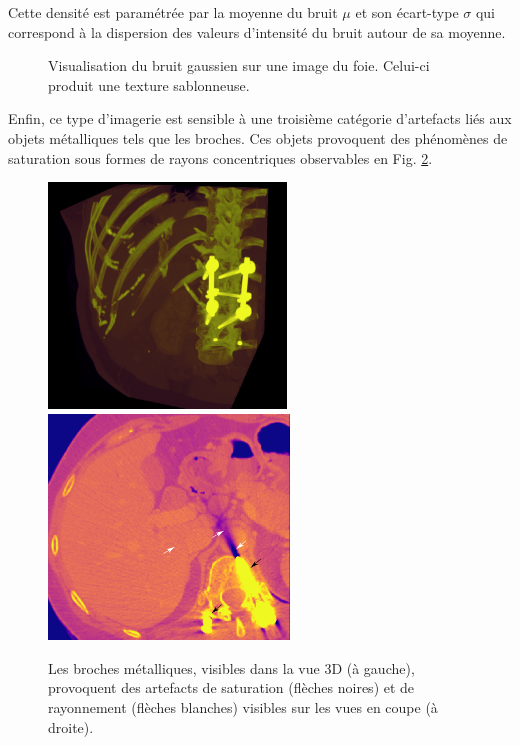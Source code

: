 Cette densité est paramétrée par la moyenne du bruit $\mu$ et son écart-type $\sigma$ qui correspond à la dispersion des valeurs d'intensité du bruit autour de sa moyenne.

\begin{figure}
    \centering
    \caption{Visualisation du bruit gaussien sur une image du foie. Celui-ci produit une texture sablonneuse.}
    \label{fig:CT_noise}
\end{figure}

Enfin, ce type d'imagerie est sensible à une troisième catégorie d'artefacts liés aux objets métalliques tels que les broches. Ces objets provoquent des phénomènes de saturation sous formes de rayons concentriques observables en Fig. \ref{fig:metallic artefacts}.

\begin{figure}
    \centering
    \includegraphics[height=6cm]{Images/broaches_CT.png}
    \includegraphics[height=6cm]{Images/broaches_CT_slice_arrow.png}
    \caption{Les broches métalliques, visibles dans la vue 3D (à gauche), provoquent des artefacts de saturation (flèches noires) et de rayonnement (flèches blanches) visibles sur les vues en coupe (à droite).}
    \label{fig:metallic artefacts}
\end{figure}

